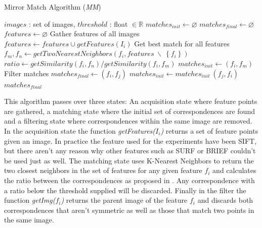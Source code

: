 \documentclass{article}
\begin{document}
\begin{algorithm}
\caption{Mirror Match Algorithm (\emph{MM})}
\label{alg-mm}
\begin{algorithmic}
\Require $images$ : set of images, $threshold$ : float $\in \mathbb{R}$
\State $matches_{init}\gets \varnothing$
\State $matches_{final}\gets \varnothing$
\State $features\gets \varnothing$
 \Comment Gather features of all images
	\State $features\gets features \cup getFeatures(I_i)$
\EndFor
{} \Comment Get best match for all features
	\State $f_m,f_n \gets getTwoNearestNeighbors(f_i, features ~ 
\backslash ~ \left\{f_i\right\})$
	\State $ratio \gets getSimilarity(f_i, f_n) / getSimilarity(f_i, 
f_m)$
		\State $matches_{init}\gets \left(f_i, f_m\right)$
	\EndIf
\EndFor
{} \Comment Filter 
matches
		\State $matches_{final} \gets (f_i, f_j)$
		\State $matches_{init} \gets matches_{init} \ (f_j, f_i)$
	\EndIf
\EndFor \\
\Return $matches_{final}$
\end{algorithmic}
\end{algorithm}

This algorithm passes over three states: An acquisition state where 
feature points are gathered, a matching state where the initial set of 
correspondences are found and a filtering state where correspondences 
within the same image are removed. In the acquisition state the function 
\emph{getFeatures($I_i$)} returns a set of feature points given an 
image.  In practice the feature used for the experiments have been 
SIFT\cite{lowe2004sift}, but there aren't any reason why other features 
such as SURF\cite{bay2006surf} or BRIEF\cite{calonder2010brief} couldn't 
be used just as well. The matching state uses K-Nearest Neighbors to 
return the two closest neighbors in the set of features for any given 
feature $f_i$ and calculates the ratio between the correspondences as 
proposed in \cite{lowe2004sift}.  Any correspondence with a ratio below 
the threshold supplied will be discarded. Finally in the filter the 
function \emph{getImg($f_i$)} returns the parent image of the feature 
$f_i$ and discards both correspondences that aren't symmetric as well as 
those that match two points in the same image.
\end{document}
